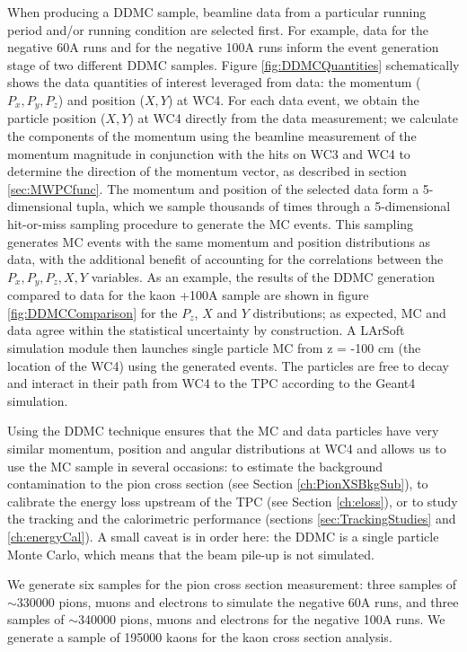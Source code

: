 When producing a DDMC sample, beamline data from a particular running period and/or running condition are selected first. For example, data for the negative 60A runs and for the negative 100A runs inform the event generation stage of two different DDMC samples. Figure \ref{fig:DDMCQuantities}  schematically shows the data quantities of interest leveraged from data: the momentum ($P_x, P_y, P_z$) and position ($X, Y$) at WC4. For each data event, we obtain the  particle position ($X, Y$) at WC4 directly from the data measurement; we calculate the components of the momentum using the beamline measurement of the momentum magnitude in conjunction with the hits on WC3 and WC4 to determine the direction of the momentum vector, as described in section \ref{sec:MWPCfunc}. The momentum and position of the selected data form a 5-dimensional tupla, which we sample thousands of times through a 5-dimensional hit-or-miss sampling procedure to generate the MC events. This sampling generates MC events  with the same momentum and position distributions as data, with the additional benefit of accounting for the correlations between the $P_x, P_y, P_z, X, Y$ variables.  As an example, the results of the DDMC generation compared to data for the kaon +100A sample are shown in figure \ref{fig:DDMCComparison} for the $P_z$, $X$ and $Y$ distributions; as expected, MC and data agree within the statistical uncertainty by construction. A LArSoft simulation module then launches single particle MC from z = -100 cm (the location of the WC4) using the generated events. The particles are free to decay and interact in their path from WC4 to the TPC according to the Geant4 simulation.

Using the DDMC technique ensures that the MC and data particles have very similar momentum, position and angular distributions at WC4 and allows us to use the MC sample in several occasions: to estimate the background contamination to the pion cross section (see Section \ref{ch:PionXSBkgSub}), to calibrate the energy loss upstream of the TPC (see Section \ref{ch:eloss}),  or to study the tracking and the calorimetric performance (sections \ref{sec:TrackingStudies} and \ref{ch:energyCal}). A small caveat is in order here: the DDMC is a single particle Monte Carlo, which means that the beam pile-up is not simulated. 


We generate six samples for the pion cross section measurement: three samples of  $\sim$330000 pions, muons and electrons to simulate the negative 60A runs, and three samples of $\sim$340000 pions, muons and electrons for the negative 100A runs. We generate a sample of  195000  kaons for the kaon cross section analysis.

